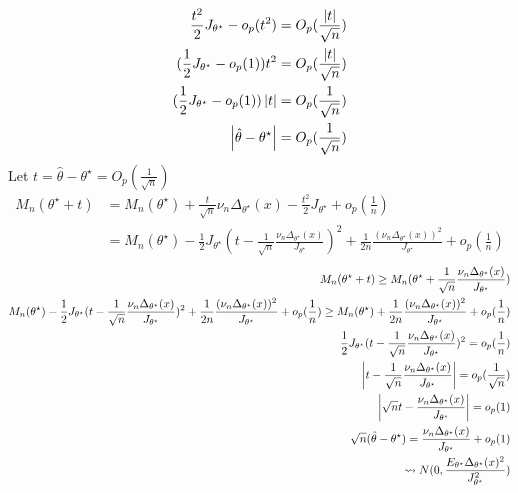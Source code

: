 \documentclass[hidequestions]{homework}
\begin{document}
\begin{align*}
    \frac{t^2}{2}J_{\theta^\star} - o_p(t^2) = O_p(\frac{\left\vert{t}\right\vert}{\sqrt{n}})\\
    (\frac{1}{2}J_{\theta^\star} - o_p(1))t^2 = O_p(\frac{\left\vert{t}\right\vert}{\sqrt{n}})\\
    (\frac{1}{2}J_{\theta^\star} - o_p(1))\left\vert{t}\right\vert = O_p(\frac{1}{\sqrt{n}})\\
    \left\vert{\hat{\theta} - \theta^\star}\right\vert = O_p(\frac{1}{\sqrt{n}})
\end{align*}
\subproblem
Let $t = \hat{\theta} - \theta^\star = O_p(\frac{1}{\sqrt{n}})$
\begin{align*}
    M_n(\theta^\star + t) &= M_n(\theta^\star) + \frac{t}{\sqrt{n}}\nu_n\Delta_{\theta^\star}(x) - \frac{t^2}{2}J_{\theta^\star} + o_p(\frac{1}{n})\\
    &= M_n(\theta^\star)  - \frac{1}{2}J_{\theta^\star}(t-\frac{1}{\sqrt{n}}\frac{\nu_n\Delta_{\theta^\star}(x)}{J_{\theta^\star}})^2 + \frac{1}{2n}\frac{(\nu_n\Delta_{\theta^\star}(x))^2}{J_{\theta^\star}} + o_p(\frac{1}{n})
\end{align*}
\begin{align*}
    M_n(\theta^\star + t) \geq M_n(\theta^\star + \frac{1}{\sqrt{n}}\frac{\nu_n\Delta_{\theta^\star}(x)}{J_{\theta^\star}})\\
    M_n(\theta^\star)  - \frac{1}{2}J_{\theta^\star}(t-\frac{1}{\sqrt{n}}\frac{\nu_n\Delta_{\theta^\star}(x)}{J_{\theta^\star}})^2 + \frac{1}{2n}\frac{(\nu_n\Delta_{\theta^\star}(x))^2}{J_{\theta^\star}} + o_p(\frac{1}{n}) \geq M_n(\theta^\star) + \frac{1}{2n}\frac{(\nu_n\Delta_{\theta^\star}(x))^2}{J_{\theta^\star}} + o_p(\frac{1}{n})\\
    \frac{1}{2}J_{\theta^\star}(t-\frac{1}{\sqrt{n}}\frac{\nu_n\Delta_{\theta^\star}(x)}{J_{\theta^\star}})^2 = o_p(\frac{1}{n})\\
    \left\vert{t-\frac{1}{\sqrt{n}}\frac{\nu_n\Delta_{\theta^\star}(x)}{J_{\theta^\star}}}\right\vert = o_p(\frac{1}{\sqrt{n}})\\
    \left\vert{\sqrt{n}t-\frac{\nu_n\Delta_{\theta^\star}(x)}{J_{\theta^\star}}}\right\vert = o_p(1)\\
    \sqrt{n}(\hat{\theta} - \theta^\star) = \frac{\nu_n\Delta_{\theta^\star}(x)}{J_{\theta^\star}} + o_p(1)\\
    \rightsquigarrow N(0, \frac{E_{\theta^\star}\Delta_{\theta^\star}(x)^2}{J_{\theta^\star}^2})
\end{align*}
\subproblem
\end{document}

